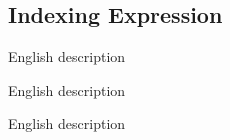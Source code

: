
\subsection{Indexing Expression}
{
	\lipsum[1]
	
	\begin{itemize}
	{
		\item[\texttt{code}] English description
		
		\item[\texttt{code}] English description
		
		\item[\texttt{code}] English description
	}
	\end{itemize}
}
